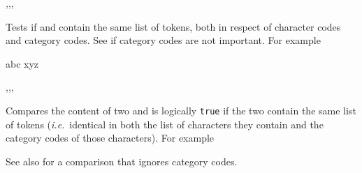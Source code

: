 \documentclass[oneside]{book}
\begin{document}
\begin{function}{\tlIfEq,\tlIfEqT,\tlIfEqF,\tlIfEqTF}
\begin{syntax}
  
   
   
    
\end{syntax}
Tests if  and  contain the
same list of tokens, both in respect of character codes and category
codes. See  if category codes are not important.
For example
\begin{demohigh}
 {abc} {} {}
 {xyz} {} {}
\end{demohigh}
\end{function}

\begin{function}{\tlVarIfEq,\tlVarIfEqT,\tlVarIfEqF,\tlVarIfEqTF}
\begin{syntax}
  
   
   
    
\end{syntax}
Compares the content of two  and
is logically \texttt{true} if the two contain the same list of
tokens (\emph{i.e.}~identical in both the list of characters they
contain and the category codes of those characters). For example
\begin{demohigh}
\tlSet {}
\tlSet {}
\tlSet {}
\tlVarIfEqTF \lTmpaTl {} {}
\tlVarIfEqTF \lTmpaTl {} {}
\end{demohigh}
See also  for a comparison that ignores category codes.
\end{function}
\end{document}
